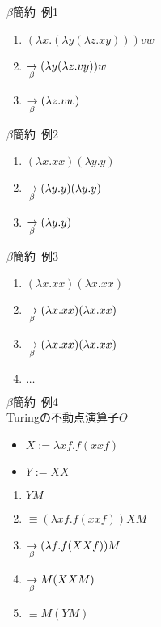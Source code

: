 \documentclass[pdflatex,17pt]{beamer}
\begin{document}
\begin{frame}{$\beta$簡約~例1}
    \begin{enumerate}
        \item $(\lambda x. (\lambda y (\lambda z. x y)))vw$
        \item $\underset{\beta}{\to} (\lambda y (\lambda z. v y))w$
        \item $\underset{\beta}{\to} (\lambda z. v w)$
    \end{enumerate}
\end{frame}

\begin{frame}{$\beta$簡約~例2}
    \begin{enumerate}
        \item $(\lambda x. x x)(\lambda y. y)$
        \item $\underset{\beta}{\to} (\lambda y. y)(\lambda y. y)$
        \item $\underset{\beta}{\to} (\lambda y. y)$
    \end{enumerate}
\end{frame}

\begin{frame}{$\beta$簡約~例3}
    \begin{enumerate}
        \item $(\lambda x. x x)(\lambda x. x x)$
        \item $\underset{\beta}{\to} (\lambda x. x x)(\lambda x. x x)$
        \item $\underset{\beta}{\to} (\lambda x. x x)(\lambda x. x x)$
        \item $\dots$
    \end{enumerate}
\end{frame}

\begin{frame}{$\beta$簡約~例4 \\ \small Turingの不動点演算子$\Theta$}
    \begin{itemize}
        \item \small $X := \lambda x f. f (x x f)$
        \item \small $Y := XX$
    \end{itemize}
    \begin{enumerate}
        \item \small $YM$
        \pause
        \item \small $\equiv (\lambda x f. f (x x f))XM$
        \pause
        \item \small $\underset{\beta}{\to} (\lambda f. f (XXf))M$
        \pause
        \item \small $\underset{\beta}{\to} M(XXM)$
        \pause
        \item \small $\equiv M(YM)$
    \end{enumerate}
\end{frame}
\end{document}
